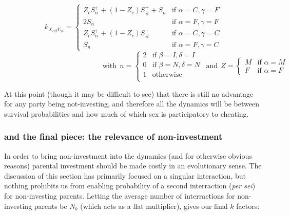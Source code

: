 \documentclass[journal,article,accept,oneauthors,pdftex,10pt,a4paper]{mdpi}
\begin{document}
$$ k_{X_{\alpha\beta}Y_{\gamma\delta}} =
\left\{
	\begin{array}{ll}
		Z_cS^+_n+(1-Z_c)S^+_\#+S_n   & \mbox{if } \alpha=C,\gamma=F \\
		2S_n        & \mbox{if } \alpha=F,\gamma=F \\
		Z_cS^+_n+(1-Z_c)S^+_\#       & \mbox{if } \alpha=C,\gamma=C \\
		S_n         & \mbox{if } \alpha=F,\gamma=C
	\end{array}
\right.$$ $$\text{ }~~~~~~~~~~~~~~~~~~~~~~~~~~~~~~~~~~~~~~~~~~~~~~~~~~~~~~~~~~~\text{with}~~n= \left\{
	\begin{array}{ll}
		2   & \mbox{if } \beta=I,\delta=I \\
		0   & \mbox{if } \beta=N,\delta=N \\
		1   & \mbox{otherwise }  \\
	\end{array}
\right.~~\text{and}~~Z= \left\{
	\begin{array}{ll}
		M   & \mbox{if } \alpha=M \\
		F   & \mbox{if } \alpha=F 
	\end{array}
\right.$$

At this point (though it may be difficult to see) that there is still no advantage for any party being not-investing, and therefore all the dynamics will be between survival probabilities and how much of which sex is participatory to cheating.

\subsubsection{and the final piece: the relevance of non-investment}

In order to bring non-investment into the dynamics (and for otherwise obvious reasons) parental investment should be made costly in an evolutionary sense.
The discussion of this section has primarily focused on a singular interaction, but nothing prohibits us from enabling probability of a second interraction (\textit{per sei}) for non-investing parents.
Letting the average number of interractions for non-investing parents be $N_b$ (which acts as a flat multiplier), gives our final $k$ factors:
\end{document}
